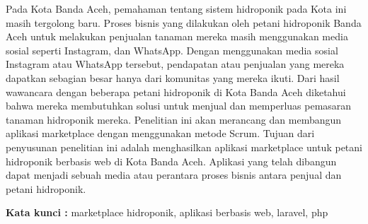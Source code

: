 \begin{abstractind}
Pada Kota Banda Aceh, pemahaman tentang sistem hidroponik pada Kota ini masih tergolong baru. Proses bisnis yang dilakukan oleh petani hidroponik Banda Aceh untuk melakukan penjualan tanaman mereka masih menggunakan media sosial seperti Instagram, dan WhatsApp. Dengan menggunakan media sosial Instagram atau WhatsApp tersebut, pendapatan atau penjualan yang mereka dapatkan sebagian besar hanya dari komunitas yang mereka ikuti. Dari hasil wawancara dengan beberapa petani hidroponik di Kota Banda Aceh diketahui bahwa mereka membutuhkan solusi untuk menjual dan memperluas pemasaran tanaman hidroponik mereka. Penelitian ini akan merancang dan membangun aplikasi marketplace dengan menggunakan metode Scrum. Tujuan dari penyusunan penelitian ini adalah menghasilkan aplikasi marketplace untuk petani hidroponik berbasis web di Kota Banda Aceh. Aplikasi yang telah dibangun dapat menjadi sebuah media atau perantara proses bisnis antara penjual dan petani hidroponik.


\bigskip
\noindent
\textbf{Kata kunci :} marketplace hidroponik, aplikasi berbasis web, laravel, php
\end{abstractind}